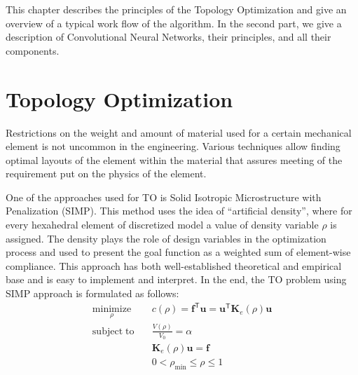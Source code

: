 
\label{chapter:Introduction}

This chapter describes the principles of the Topology Optimization and give an overview of a typical work flow of the algorithm. 
In the second part, we give a description of Convolutional Neural Networks, their principles, and all their components.


\chapter{Topology Optimization}

Restrictions on the weight and amount of material used for a certain mechanical element is not uncommon in the engineering.
Various techniques allow finding optimal layouts of the element within the material that assures meeting of the requirement put on the physics of the element. 
\medskip

One of the approaches used for TO is Solid Isotropic Microstructure with Penalization (SIMP).
This method uses the idea of ``artificial density''\cite{to_simp}, where for every hexahedral element of discretized model a value of density variable $\rho$ is assigned.
The density plays the role of design variables in the optimization process and used to present the goal function as a weighted sum of element-wise compliance.
This approach has both well-established theoretical and empirical base and is easy to implement and interpret.
In the end, the TO problem using SIMP approach is formulated as follows:
\begin{align*}
	\underset{\rho}{\mathrm{minimize}} \quad & c(\rho) = \mathbf{f}^{\mathsf{T}} \mathbf{u} = \mathbf{u}^{\mathsf{T}} \mathbf{K}_{e}(\rho) \mathbf{u} \\
	\mathrm{subject \; to} \quad & \frac{V(\rho)}{V_{0}} = \alpha \\
	& \mathbf{K}_{e}(\rho) \mathbf{u} = \mathbf{f} \\
	& 0 < \rho_{\min} \leq \rho \leq 1
\end{align*} 

